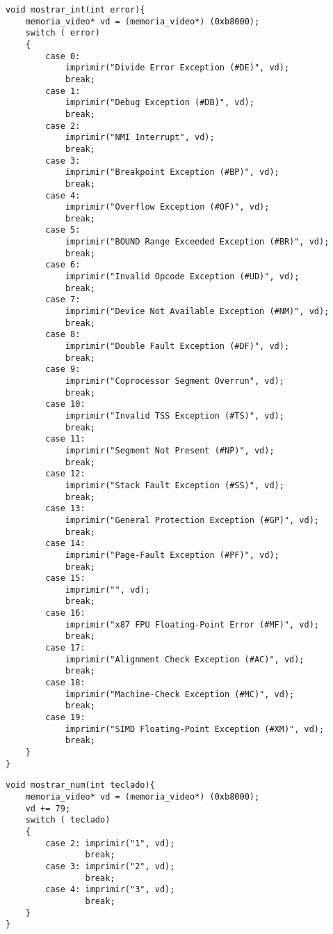 \begin{codesnippet}
\begin{verbatim}
void mostrar_int(int error){
	memoria_video* vd = (memoria_video*) (0xb8000);
	switch ( error)
	{
		case 0:
			imprimir("Divide Error Exception (#DE)", vd);
			break;
		case 1:
			imprimir("Debug Exception (#DB)", vd);
			break;
		case 2:
			imprimir("NMI Interrupt", vd);
			break;
		case 3:
			imprimir("Breakpoint Exception (#BP)", vd);
			break;
		case 4:
			imprimir("Overflow Exception (#OF)", vd);
			break;
		case 5:
			imprimir("BOUND Range Exceeded Exception (#BR)", vd);
			break;
		case 6:
			imprimir("Invalid Opcode Exception (#UD)", vd);
			break;
		case 7:
			imprimir("Device Not Available Exception (#NM)", vd);
			break;
		case 8:
			imprimir("Double Fault Exception (#DF)", vd);
			break;
		case 9:
			imprimir("Coprocessor Segment Overrun", vd);
			break;
		case 10:
			imprimir("Invalid TSS Exception (#TS)", vd);
			break;
		case 11:
			imprimir("Segment Not Present (#NP)", vd);
			break;
		case 12:
			imprimir("Stack Fault Exception (#SS)", vd);
			break;
		case 13:
			imprimir("General Protection Exception (#GP)", vd);
			break;
		case 14:
			imprimir("Page-Fault Exception (#PF)", vd);
			break;
		case 15:
			imprimir("", vd);
			break;
		case 16:
			imprimir("x87 FPU Floating-Point Error (#MF)", vd);
			break;
		case 17:
			imprimir("Alignment Check Exception (#AC)", vd);
			break;
		case 18:
			imprimir("Machine-Check Exception (#MC)", vd);
			break;
		case 19:
			imprimir("SIMD Floating-Point Exception (#XM)", vd);
			break;
	}
}
\end{verbatim}
\end{codesnippet}

\begin{codesnippet}
\begin{verbatim}
void mostrar_num(int teclado){
	memoria_video* vd = (memoria_video*) (0xb8000);
	vd += 79;
	switch ( teclado)
	{
		case 2:	imprimir("1", vd);
				break;
		case 3: imprimir("2", vd);
				break;
		case 4: imprimir("3", vd);
				break;
	}
}
\end{verbatim}
\end{codesnippet}
